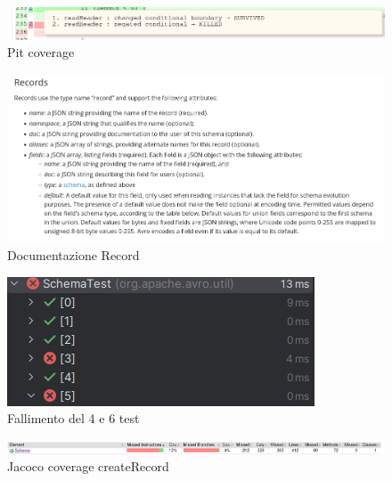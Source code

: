 \documentclass[10pt, a4paper]{article}
\begin{document}
  \begin{figure}
    \includegraphics[width=\linewidth]{./images/file_info/PitCoverageReadHeader3.png}
    \caption{Pit coverage}
    \label{fig:PitCoverageReadHeader3}
  \end{figure}

  \begin{figure}
    \includegraphics[width=\linewidth]{./images/create_record/Documentation.png}
    \caption{Documentazione Record}
    \label{fig:Documentation}
  \end{figure}

  \begin{figure}
    \includegraphics[width=\linewidth]{./images/create_record/TestFailsCreateRecord.png}
    \caption{Fallimento del 4 e 6 test}
    \label{fig:TestFailsCreateRecord}
  \end{figure}

  \begin{figure}
    \includegraphics[width=\linewidth]{./images/create_record/JacocoCoverage1.png}
    \caption{Jacoco coverage createRecord}
    \label{fig:JacocoCoverageCreateRecord1}
  \end{figure}
\end{document}
